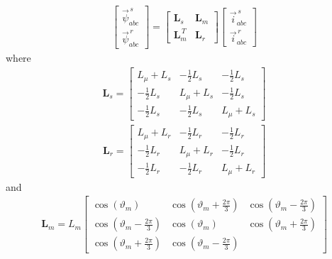 \documentclass[11pt,a4paper]{scrartcl}
\numberwithin{equation}{section}
\theoremstyle{it}
\theoremstyle{definition}
\begin{document}
\begin{onehalfspace}
\begin{equation}
	\begin{aligned}
		\begin{bmatrix} \vec{\psi}^{\,s}_{abc} \\[6pt] \vec{\psi}^{\,r}_{abc} 
		\end{bmatrix} = \begin{bmatrix} \mathbf{L}_s & \mathbf{L}_{m} \\[6pt] 
			\mathbf{L}_{m}^{\,T} & \mathbf{L}_{r} \end{bmatrix}\begin{bmatrix} 
			\vec{i}^{\,s}_{abc} \\[6pt] \vec{i}^{\,r}_{abc} \end{bmatrix}
	\end{aligned}
\end{equation}
where
\begin{equation}\label{im_eq_6}
	\begin{aligned}
		\mathbf{L}_s = \begin{bmatrix} L_\mu+L_s & -\frac{1}{2}L_s & 
			-\frac{1}{2}L_s \\[6pt] -\frac{1}{2}L_s & L_\mu+L_s & 
			-\frac{1}{2}L_s 
			\\[6pt] -\frac{1}{2}L_s & -\frac{1}{2}L_s & L_\mu+L_s \end{bmatrix}
	\end{aligned}
\end{equation}
\begin{equation}\label{im_eq_7}
	\begin{aligned}
		\mathbf{L}_r = \begin{bmatrix} L_\mu+L_r & -\frac{1}{2}L_r & 
			-\frac{1}{2}L_r \\[6pt] -\frac{1}{2}L_r & L_\mu+L_r & 
			-\frac{1}{2}L_r 
			\\[6pt] -\frac{1}{2}L_r & -\frac{1}{2}L_r & L_\mu+L_r \end{bmatrix}
	\end{aligned}
\end{equation}
and
\begin{equation}\label{im_eq_8}
	\begin{aligned}
		\mathbf{L}_m = L_m\begin{bmatrix} \cos(\vartheta_{m}) & 
			\cos(\vartheta_{m}+\frac{2\pi}{3}) & 
			\cos(\vartheta_{m}-\frac{2\pi}{3}) 
			\\[6pt] \cos(\vartheta_{m}-\frac{2\pi}{3}) & \cos(\vartheta_{m}) & 
			\cos(\vartheta_{m}+\frac{2\pi}{3}) \\[6pt] 
			\cos(\vartheta_{m}+\frac{2\pi}{3}) & 
			\cos(\vartheta_{m}-\frac{2\pi}{3}) 

\end{bmatrix}
\end{aligned}
\end{equation}
\end{onehalfspace}
\end{document}

